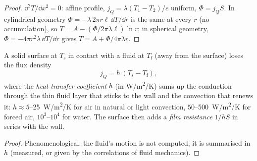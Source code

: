 \begin{proof}
$\dd^2T/\dd x^2 = 0$: affine profile, $j_Q = \lambda(T_1 - T_2)/e$
uniform, $\Phi = j_QS$. In cylindrical geometry $\Phi = -\lambda\,2\pi
r\ell\,\dd T/\dd r$ is the same at every $r$ (no accumulation), so
$T = A - (\Phi/2\pi\lambda\ell)\ln r$; in spherical geometry, $\Phi =
-4\pi r^2\lambda\,\dd T/\dd r$ gives $T = A + \Phi/4\pi\lambda r$.
\end{proof}

\begin{proposition}\label{prop:b2:heat-conduction:newton}
A solid surface at $T_{\text{s}}$ in contact with a fluid at $T_{\text{f}}$
(away from the surface) loses the flux density
\[
j_Q = h\,(T_{\text{s}} - T_{\text{f}}) ,
\]
where the \emph{heat transfer coefficient} $h$ (in \unit{W/m^2/K}) sums up the conduction through
the thin fluid layer that sticks to the wall and the convection that
renews it: $h \approx 5$--\qty{25}{W/m^2/K} for air in natural or
light convection, $50$--\qty{500}{W/m^2/K} for forced air, $10^3$--$10^4$
for water. The surface then adds a \emph{film resistance} $1/hS$ in
series with the wall.
\end{proposition}

\begin{proof}
Phenomenological: the fluid's motion is not computed, it is summarised
in $h$ (measured, or given by the correlations of fluid mechanics).
\end{proof}

